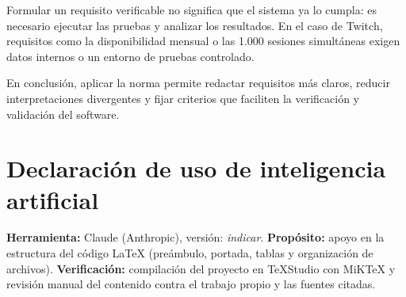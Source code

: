 \documentclass[10pt,a4paper]{article}
\begin{document}
Formular un requisito verificable no significa que el sistema ya lo cumpla: es necesario ejecutar las pruebas y analizar los resultados. En el caso de Twitch, requisitos como la disponibilidad mensual o las 1.000 sesiones simultáneas exigen datos internos o un entorno de pruebas controlado.


En conclusión, aplicar la norma permite redactar requisitos más claros, reducir interpretaciones divergentes y fijar criterios que faciliten la verificación y validación del software.

\section{Declaración de uso de inteligencia artificial}
\textbf{Herramienta:} Claude (Anthropic), versión: \textit{indicar}. \textbf{Propósito:} apoyo en la estructura del código \LaTeX{} (preámbulo, portada, tablas y organización de archivos). \textbf{Verificación:} compilación del proyecto en TeXStudio con MiKTeX y revisión manual del contenido contra el trabajo propio y las fuentes citadas.



\end{document}
